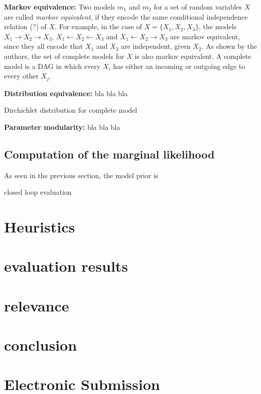 \documentclass{article}
\begin{document}
	\textbf{Markov equivalence:}
	Two models $m_1$ and $m_2$ for a set of random variables $X$ are called \textit{markov equivalent},
	if they encode the same conditional independence relation (?) of $X$. For example, in the case of
	$X=\{X_1,X_2,X_3\}$, the models $X_1 \rightarrow X_2 \rightarrow X_3$,
	$X_1 \leftarrow X_2 \leftarrow X_3$ and $X_1 \leftarrow X_2 \rightarrow X_3$ are 
	markov equivalent, since they all encode that $X_1$ and $X_3$ are independent, given $X_2$.
	As shown by the authors, the set of complete models for $X$ is also markov equivalent. 
	A complete model is a DAG in which every $X_i$ has either an 	incoming or outgoing edge 
	to every other $X_j$.
	
	\textbf{Distribution equivalence:}
	bla bla bla
	
	Dirchichlet distribution for complete model
	
	\textbf{Parameter modularity:}
	bla bla bla
	
	\subsection{Computation of the marginal likelihood}
	As seen in the previous section, the model prior is 
	
	closed loop evaluation 
	
	

\section{Heuristics}
\section{evaluation results}

\section{relevance}

\section{conclusion}







\section{Electronic Submission}
\label{submission}
\end{document}
